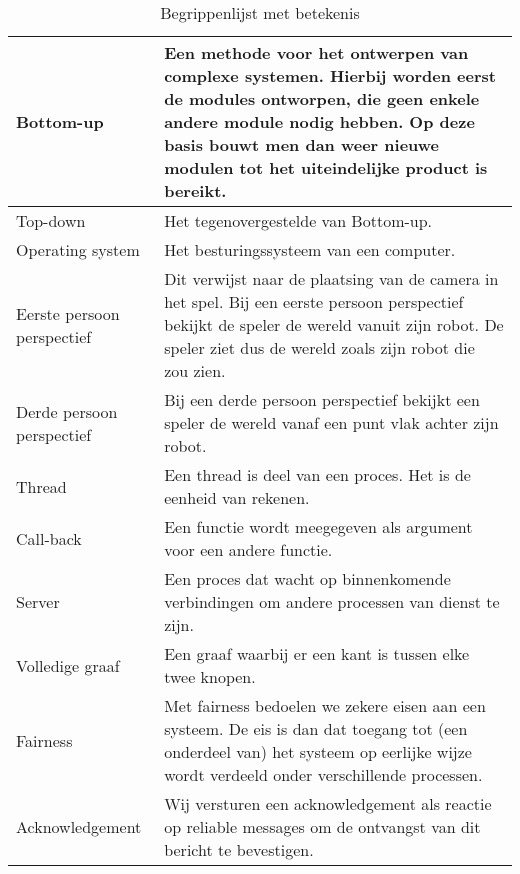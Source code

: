 \begin{table}[H]
\begin{tabular}{| l | p{12cm} |}
        Bottom-up & Een methode voor het ontwerpen van complexe systemen. Hierbij worden eerst de modules ontworpen, die geen enkele andere
            module nodig hebben. Op deze basis bouwt men dan weer nieuwe modulen tot het uiteindelijke product is bereikt. \\ \hline
        Top-down & Het tegenovergestelde van Bottom-up.\\ \hline
        Operating system & Het besturingssysteem van een computer. \\ \hline
        Eerste persoon perspectief & Dit verwijst naar de plaatsing van de camera in het spel. Bij een eerste persoon perspectief
            bekijkt de speler de wereld vanuit zijn robot. De speler ziet dus de wereld zoals zijn robot die zou zien. \\ \hline
        Derde persoon perspectief & Bij een derde persoon perspectief bekijkt een speler de wereld vanaf een punt vlak achter
            zijn robot. \\ \hline
        Thread & Een thread is deel van een proces. Het is de eenheid van rekenen. \\ \hline
        Call-back & Een functie wordt meegegeven als argument voor een andere functie. \\ \hline
        Server & Een proces dat wacht op binnenkomende verbindingen om andere processen van dienst te zijn. \\ \hline
        Volledige graaf & Een graaf waarbij er een kant is tussen elke twee knopen. \\ \hline
        Fairness & Met fairness bedoelen we zekere eisen aan een systeem. De eis is dan dat toegang tot (een onderdeel van) het systeem
            op eerlijke wijze wordt verdeeld onder verschillende processen. \\ \hline
        Acknowledgement & Wij versturen een acknowledgement als reactie op reliable messages om de ontvangst van dit bericht te bevestigen. \\ \hline
        \end{tabular}
        \caption{Begrippenlijst met betekenis}
        \label{tab:planning}
    \end{table} 